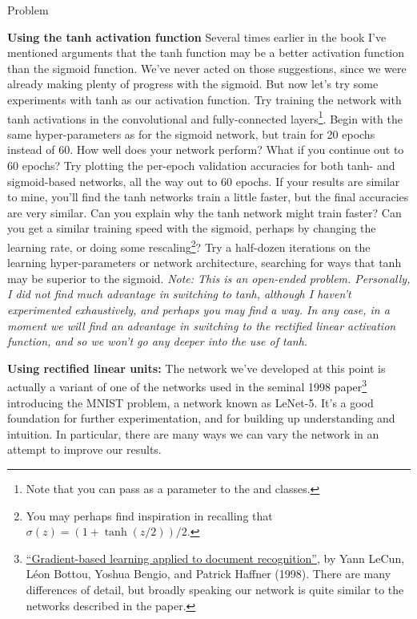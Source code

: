 \documentclass[a4paper,twoside,10pt]{book}
\begin{document}
\begin{exercize}{Problem}
	\item \textbf{Using the tanh activation function} Several times earlier in the book I've mentioned arguments that the tanh function may be a better activation function than the sigmoid function. We've never acted on those suggestions, since we were already making plenty of progress with the sigmoid. But now let's try some experiments with tanh as our activation function. Try training the network with tanh activations in the convolutional and fully-connected layers\footnote{Note that you can pass  as a parameter to the  and  classes.}. Begin with the same hyper-parameters as for the sigmoid network, but train for 20 epochs instead of 60. How well does your network perform? What if you continue out to 60 epochs? Try plotting the per-epoch validation accuracies for both tanh- and sigmoid-based networks, all the way out to 60 epochs. If your results are similar to mine, you'll find the tanh networks train a little faster, but the final accuracies are very similar. Can you explain why the tanh network might train faster? Can you get a similar training speed with the sigmoid, perhaps by changing the learning rate, or doing some rescaling\footnote{You may perhaps find inspiration in recalling that $\sigma(z) = (1+\tanh(z/2))/2$.}? Try a half-dozen iterations on the learning hyper-parameters or network architecture, searching for ways that tanh may be superior to the sigmoid. \textit{Note: This is an open-ended problem. Personally, I did not find much advantage in switching to tanh, although I haven't experimented exhaustively, and perhaps you may find a way. In any case, in a moment we will find an advantage in switching to the rectified linear activation function, and so we won't go any deeper into the use of tanh.}
\end{exercize}
\textbf{Using rectified linear units:} The network we've developed at this point is actually a variant of one of the networks used in the seminal 1998 paper\footnote{\href{http://yann.lecun.com/exdb/publis/pdf/lecun-98.pdf}{``Gradient-based learning applied to document recognition''}, by Yann LeCun, L\'eon Bottou, Yoshua Bengio, and Patrick Haffner (1998). There are many differences of detail, but broadly speaking our network is quite similar to the networks described in the paper.} introducing the MNIST problem, a network known as LeNet-5. It's a good foundation for further experimentation, and for building up understanding and intuition. In particular, there are many ways we can vary the network in an attempt to improve our results.
\end{document}
